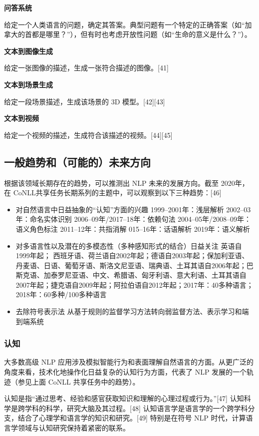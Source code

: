 \textbf{问答系统}  

给定一个人类语言的问题，确定其答案。典型问题有一个特定的正确答案（如“加拿大的首都是哪里？”），但有时也考虑开放性问题（如“生命的意义是什么？”）。

\textbf{文本到图像生成} 

给定一张图像的描述，生成一张符合描述的图像。[41]

\textbf{文本到场景生成}  

给定一段场景描述，生成该场景的 3D 模型。[42][43]

\textbf{文本到视频}  

给定一个视频的描述，生成符合该描述的视频。[44][45]
\subsection{一般趋势和（可能的）未来方向}
根据该领域长期存在的趋势，可以推测出 NLP 未来的发展方向。截至 2020年，在 CoNLL共享任务长期系列的主题中，可以观察到以下三种趋势：[46]
\begin{itemize}
\item 对自然语言中日益抽象的“认知”方面的兴趣 1999–2001年：浅层解析 2002–03年：命名实体识别 2006–09年/2017–18年：依赖句法 2004–05年/2008–09年：语义角色标注  2011–12年：共指消解 015–16年：话语解析 2019年：语义解析
\item 对多语言性以及潜在的多模态性（多种感知形式的结合）日益关注 英语自1999年起； 西班牙语、荷兰语自2002年起；德语自2003年起；保加利亚语、丹麦语、日语、葡萄牙语、斯洛文尼亚语、瑞典语、土耳其语自2006年起；巴斯克语、加泰罗尼亚语、中文、希腊语、匈牙利语、意大利语、土耳其语自2007年起；捷克语自2009年起；阿拉伯语自2012年起；2017年：40多种语言；2018年：60多种/100多种语言
\item 去除符号表示法 从基于规则的监督学习方法转向弱监督方法、表示学习和端到端系统
\end{itemize}
\subsubsection{认知}
大多数高级 NLP 应用涉及模拟智能行为和表面理解自然语言的方面。从更广泛的角度来看，技术化地操作化日益复杂的认知行为方面，代表了 NLP 发展的一个轨迹（参见上面 CoNLL 共享任务中的趋势）。

认知是指“通过思考、经验和感官获取知识和理解的心理过程或行为。”[47] 认知科学是跨学科的科学，研究大脑及其过程。[48] 认知语言学是语言学的一个跨学科分支，结合了心理学和语言学的知识和研究。[49] 特别是在符号 NLP 时代，计算语言学领域与认知研究保持着紧密的联系。

